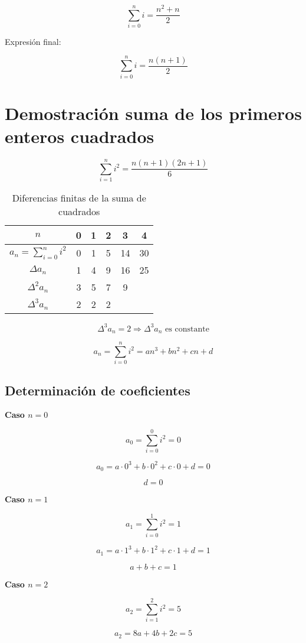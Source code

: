 \[
\sum_{i=0}^{n} i = \frac{n^2 + n}{2}
\]

Expresión final:

\[
\sum_{i=0}^{n} i = \frac{n(n+1)}{2}
\]

\section*{Demostración suma de los primeros enteros cuadrados}

\[
\sum_{i=1}^{n} i^2 = \frac{n(n+1)(2n+1)}{6}
\]

\begin{table}[h]
    \centering
    \begin{tabular}{c|c|c|c|c|c}
        \( n \) & 0 & 1 & 2 & 3 & 4 \\ \hline
        \( a_n = \sum_{i=0}^{n} i^2 \) & 0 & 1 & 5 & 14 & 30 \\ \hline
        \( \Delta a_n \) & 1 & 4 & 9 & 16 & 25 \\ \hline
        \( \Delta^2 a_n \) & 3 & 5 & 7 & 9 &  \\ \hline
        \( \Delta^3 a_n \) & 2 & 2 & 2 &  &  
    \end{tabular}
    \caption{Diferencias finitas de la suma de cuadrados}
    \label{tabla_suma_cuadrados}
\end{table}

\[
\Delta^3 a_n = 2 \Rightarrow \Delta^3 a_n \text{ es constante}
\]

\[
a_n = \sum_{i=0}^{n} i^2 = a n^3 + b n^2 + c n + d
\]

\subsection*{Determinación de coeficientes}

\textbf{Caso \( n = 0 \)}

\[
a_0 = \sum_{i=0}^{0} i^2 = 0
\]

\[
a_0 = a \cdot 0^3 + b \cdot 0^2 + c \cdot 0 + d = 0
\]

\[
d = 0
\]

\textbf{Caso \( n = 1 \)}

\[
a_1 = \sum_{i=0}^{1} i^2 = 1
\]

\[
a_1 = a \cdot 1^3 + b \cdot 1^2 + c \cdot 1 + d = 1
\]

\[
a + b + c = 1
\]

\textbf{Caso \( n = 2 \)}

\[
a_2 = \sum_{i=1}^{2} i^2 = 5
\]

\[
a_2 = 8a + 4b + 2c = 5
\]

